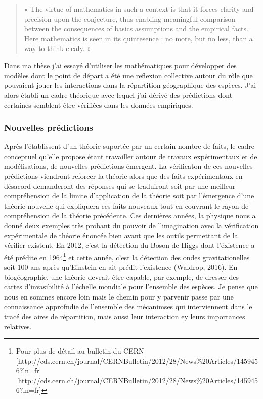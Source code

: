 \begin{quote}
« The virtue of mathematics in such a context is that it forces clarity
and precision upon the conjecture, thus enabling meaningful comparison
between the consequences of basics assumptions and the empirical facts.
Here mathematics is seen in its quintesence : no more, but no less, than
a way to think clealy. »
\end{quote}

Dans ma thèse j'ai essayé d'utiliser les mathématiques pour développer
des modèles dont le point de départ a été une reflexion collective
autour du rôle que pouvaient jouer les interactions dans la répartition
géographique des espèces. J'ai alors établi un cadre théorique avec
lequel j'ai dérivé des prédictions dont certaines semblent être
vérifiées dans les données empiriques.

\subsubsection*{Nouvelles prédictions}\label{nouvelles-pruxe9dictions}

Après l'établissent d'un théorie suportée par un certain nombre de
faits, le cadre conceptuel qu'elle propose étant travailler autour de
travaux expérimentaux et de modélisations, de nouvelles prédictions
émergent. La vérificaton de ces nouvelles prédictions viendront reforcer
la théorie alors que des faits expérimentaux en désacord demanderont des
réponses qui se traduiront soit par une meilleur compréhension de la
limite d'application de la théorie soit par l'émergence d'une théorie
nouvelle qui expliquera ces faits nouveaux tout en couvrant le rayon de
compréhension de la théorie précédente. Ces dernières années, la
physique nous a donné deux exemples très probant du pouvoir de
l'imagination avec la vérification expérimentale de théorie énoncée bien
avant que les outils permettant de la vérifier existent. En 2012, c'est
la détection du Boson de Higgs dont l'éxistence a été prédite en
1964\footnote{Pour plus de détail au bulletin du CERN
  {[}http://cds.cern.ch/journal/CERNBulletin/2012/28/News\%20Articles/1459456?ln=fr{]}{[}http://cds.cern.ch/journal/CERNBulletin/2012/28/News\%20Articles/1459456?ln=fr{]}}
et cette année, c'est la détection des ondes gravitationelles soit 100
ans après qu'Einstein en ait prédit l'existence (Waldrop, 2016). En
biogéographie, une théorie devrait être capable, par exemple, de dresser
des cartes d'invasibilité à l'échelle mondiale pour l'ensemble des
espèces. Je pense que nous en sommes encore loin mais le chemin pour y
parvenir passe par une connaissance approfndie de l'ensemble des
mécanimses qui interviennent dans le tracé des aires de répartition,
mais aussi leur interaction ey leurs importances relatives.

